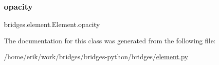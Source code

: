 \mbox{\label{classbridges_1_1element_1_1_element_a5af50d5fc696eb8c295245bd5d1c0c91}} 
\subsubsection{\texorpdfstring{opacity}{opacity}}
{\footnotesize\ttfamily bridges.\+element.\+Element.\+opacity}



The documentation for this class was generated from the following file\+:\begin{DoxyCompactItemize}
\item 
/home/erik/work/bridges/bridges-\/python/bridges/\hyperlink{element_8py}{element.\+py}\end{DoxyCompactItemize}
